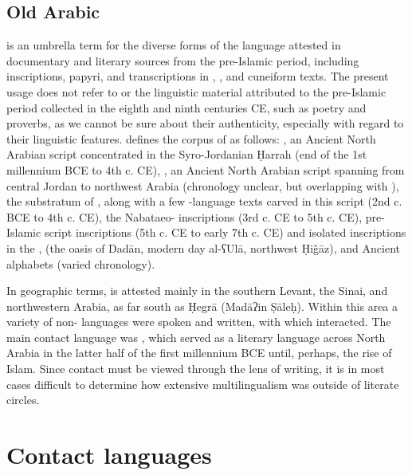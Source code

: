 \documentclass[output=paper]{langsci/langscibook}
\begin{document}
\subsection{Old Arabic}
  is an umbrella term for the diverse forms of the language attested in documentary and literary sources from the pre-Islamic period, including inscriptions, papyri, and transcriptions in , , and cuneiform texts. The present usage does not refer to   or the linguistic material attributed to the pre-Islamic period collected in the eighth and ninth centuries CE, such as poetry and proverbs, as we cannot be sure about their authenticity, especially with regard to their linguistic features. \citet{Al-Jallad2017early} defines the corpus of   as follows: , an Ancient North Arabian script concentrated in the Syro-Jordanian Ḥarrah (end of the 1st millennium BCE to 4th c. CE), , an Ancient North Arabian script spanning from central Jordan to northwest Arabia (chronology unclear, but overlapping with ), the substratum of , along with a few -language texts carved in this script (2nd c. BCE to 4th c. CE), the Nabataeo- inscriptions (3rd c. CE to 5th c. CE), pre-Islamic  script inscriptions (5th c. CE to early 7th c. CE) and isolated inscriptions in the ,  (the oasis of Dadān, modern day al-ʕUlā, northwest Ḥiǧāz), and Ancient  alphabets (varied chronology). 

In geographic terms,   is attested mainly in the southern Levant, the Sinai, and northwestern Arabia, as far south as Ḥegrā (Madāʔin Ṣāleḥ). Within this area a variety of non- languages were spoken and written, with which   interacted. The main contact language was , which served as a literary language across North Arabia in the latter half of the first millennium BCE until, perhaps, the rise of Islam. Since contact must be viewed through the lens of writing, it is in most cases difficult to determine how extensive multilingualism was outside of literate circles.

\section{Contact languages}
\end{document}
